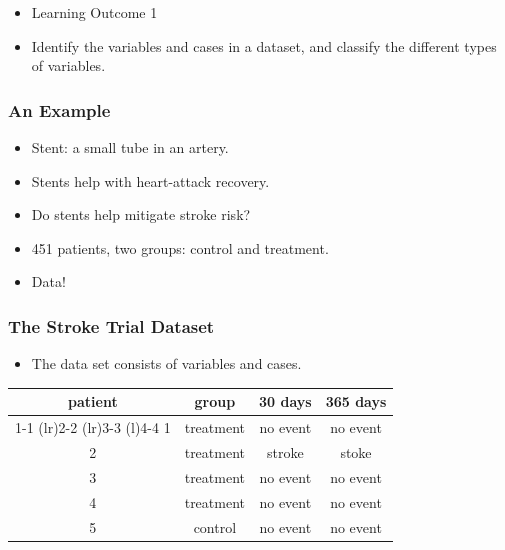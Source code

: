\documentclass{beamer}
\begin{document}
\begin{frame}
  \begin{itemize}
    \item[] Learning Outcome 1
      \vspace{0.5cm}
    \item[] Identify the variables and cases in a dataset, and
    classify the different types of variables. 
  \end{itemize}
\end{frame}

\begin{frame}
  \frametitle{An Example}
  \begin{itemize}
    \item[] Stent: a small tube in an artery. 
      \vspace{0.5cm}
    \item[] Stents help with heart-attack recovery. 
      \vspace{0.5cm}
    \item[] Do stents help mitigate stroke risk?
      \vspace{0.5cm}
    \item[] 451 patients, two groups: control and treatment. 
      \vspace{0.5cm}
    \item[] Data!
  \end{itemize}
\end{frame}

\begin{frame}
  \frametitle{The Stroke Trial Dataset}
  \begin{itemize}
    \item[] The data set consists of variables and cases.
      \vspace{0.5cm}
  \end{itemize}
  \begin{table}
    \begin{tabular}{@{}cccc@{}}
      \toprule
      patient & group & 30 days & 365 days \\ 
      \cmidrule(r){1-1} \cmidrule(lr){2-2} \cmidrule(lr){3-3}
      \cmidrule(l){4-4}
      1 & treatment & no event & no event \\[0.3em]
      2 & treatment & stroke & stoke \\[0.3em]
      3 & treatment & no event & no event \\[0.3em]
      4 & treatment & no event & no event \\[0.3em]
      5 & control & no event & no event \\
      \bottomrule
    \end{tabular}
  \end{table}
\end{frame}
\end{document}
